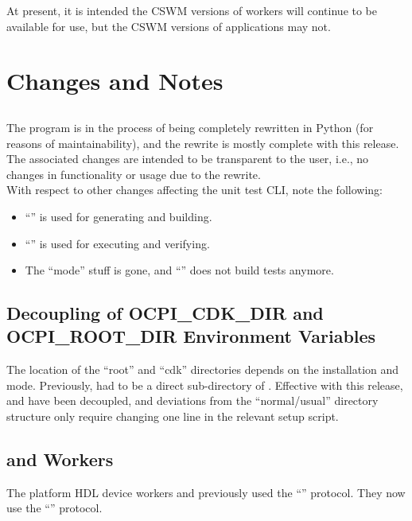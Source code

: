 At present, it is intended the CSWM versions of workers will continue to be available for use, but the CSWM versions of applications may not. 

\section{Changes and Notes}

\subsection{}
\label{sec:22_ocpidev}
The  program is in the process of being completely rewritten in Python (for reasons of maintainability), and the rewrite is mostly complete with this release. The associated changes are intended to be transparent to the user, i.e., no changes in functionality or usage due to the rewrite.\\

With respect to other  changes affecting the unit test CLI, note the following:
\begin{itemize}
\setlength\itemsep{0em} %
\item ``'' is used for generating and building.
\item ``'' is used for executing and verifying.
\item The ``mode'' stuff is gone, and ``'' does not build tests anymore.
\end{itemize}

\subsection{Decoupling of OCPI\_CDK\_DIR and OCPI\_ROOT\_DIR Environment Variables}
\label{sec:22_cdk_rootdir}
The location of the ``root'' and ``cdk'' directories depends on the installation and mode.  Previously,  had to be a direct sub-directory of .  Effective with this release,  and  have been decoupled, and deviations from the ``normal/usual'' directory structure only require changing one line in the relevant setup script.

\subsection{ and  Workers}
\label{sec:22_worker_updates}
The platform HDL device workers  and  previously used the ``'' protocol.  They now use the ``'' protocol.

